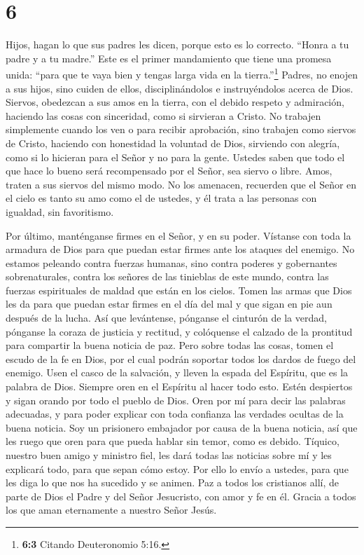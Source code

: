 \hypertarget{section-5}{%
\section{6}\label{section-5}}

 Hijos, hagan lo que sus padres les dicen, porque esto es lo
correcto.  ``Honra a tu padre y a tu madre.'' Este es el
primer mandamiento que tiene una promesa unida:  ``para que
te vaya bien y tengas larga vida en la tierra.''\footnote{\textbf{6:3}
  Citando Deuteronomio 5:16.}  Padres, no enojen a sus
hijos, sino cuiden de ellos, disciplinándolos e instruyéndolos acerca de
Dios.  Siervos, obedezcan a sus amos en la tierra, con el
debido respeto y admiración, haciendo las cosas con sinceridad, como si
sirvieran a Cristo.  No trabajen simplemente cuando los ven
o para recibir aprobación, sino trabajen como siervos de Cristo,
haciendo con honestidad la voluntad de Dios,  sirviendo con
alegría, como si lo hicieran para el Señor y no para la gente.
 Ustedes saben que todo el que hace lo bueno será
recompensado por el Señor, sea siervo o libre.  Amos, traten
a sus siervos del mismo modo. No los amenacen, recuerden que el Señor en
el cielo es tanto su amo como el de ustedes, y él trata a las personas
con igualdad, sin favoritismo.

 Por último, manténganse firmes en el Señor, y en su poder.
 Vístanse con toda la armadura de Dios para que puedan
estar firmes ante los ataques del enemigo.  No estamos
peleando contra fuerzas humanas, sino contra poderes y gobernantes
sobrenaturales, contra los señores de las tinieblas de este mundo,
contra las fuerzas espirituales de maldad que están en los cielos.
 Tomen las armas que Dios les da para que puedan estar
firmes en el día del mal y que sigan en pie aun después de la lucha.
 Así que levántense, pónganse el cinturón de la verdad,
pónganse la coraza de justicia y rectitud,  y colóquense el
calzado de la prontitud para compartir la buena noticia de paz.
 Pero sobre todas las cosas, tomen el escudo de la fe en
Dios, por el cual podrán soportar todos los dardos de fuego del enemigo.
 Usen el casco de la salvación, y lleven la espada del
Espíritu, que es la palabra de Dios.  Siempre oren en el
Espíritu al hacer todo esto. Estén despiertos y sigan orando por todo el
pueblo de Dios.  Oren por mí para decir las palabras
adecuadas, y para poder explicar con toda confianza las verdades ocultas
de la buena noticia.  Soy un prisionero embajador por causa
de la buena noticia, así que les ruego que oren para que pueda hablar
sin temor, como es debido.  Tíquico, nuestro buen amigo y
ministro fiel, les dará todas las noticias sobre mí y les explicará
todo, para que sepan cómo estoy.  Por ello lo envío a
ustedes, para que les diga lo que nos ha sucedido y se animen.
 Paz a todos los cristianos allí, de parte de Dios el Padre
y del Señor Jesucristo, con amor y fe en él.  Gracia a
todos los que aman eternamente a nuestro Señor Jesús.
